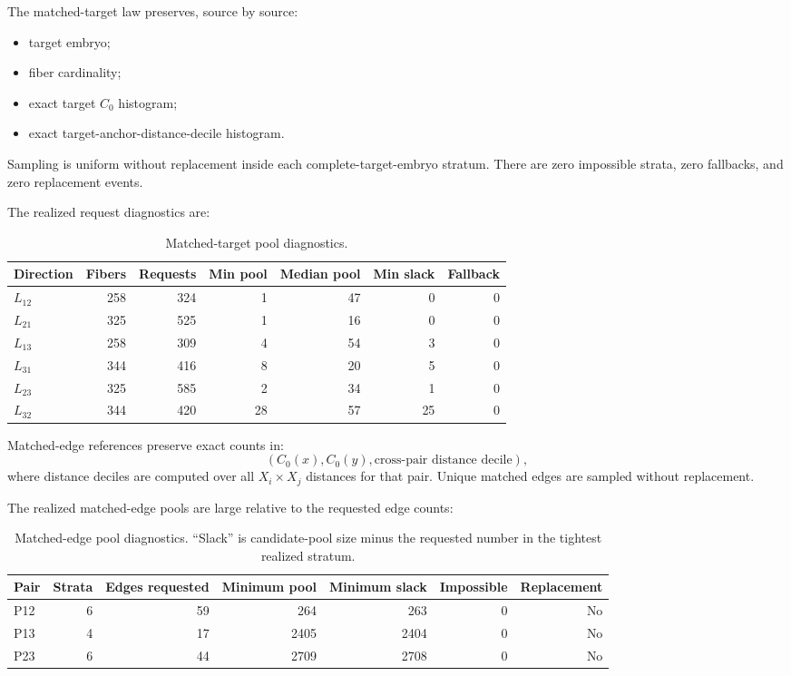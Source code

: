 \documentclass[11pt]{article}
\newcommand{\Czero}{C_0}
\begin{document}
The matched-target law preserves, source by source:
\begin{itemize}[leftmargin=2em]
\item target embryo;
\item fiber cardinality;
\item exact target \(\Czero\) histogram;
\item exact target-anchor-distance-decile histogram.
\end{itemize}
Sampling is uniform without replacement inside each complete-target-embryo stratum. There are zero impossible strata, zero fallbacks, and zero replacement events.

The realized request diagnostics are:

\begin{table}[htbp]
\centering
\small
\caption{Matched-target pool diagnostics.}
\begin{tabular}{@{}lrrrrrr@{}}
\toprule
Direction & Fibers & Requests & Min pool & Median pool & Min slack & Fallback\\
\midrule
\(L_{12}\)&258&324&1&47&0&0\\
\(L_{21}\)&325&525&1&16&0&0\\
\(L_{13}\)&258&309&4&54&3&0\\
\(L_{31}\)&344&416&8&20&5&0\\
\(L_{23}\)&325&585&2&34&1&0\\
\(L_{32}\)&344&420&28&57&25&0\\
\bottomrule
\end{tabular}
\end{table}

Matched-edge references preserve exact counts in:
\[
(\Czero(x),\Czero(y),\text{cross-pair distance decile}),
\]
where distance deciles are computed over all \(X_i\times X_j\) distances for that pair. Unique matched edges are sampled without replacement.

The realized matched-edge pools are large relative to the requested edge counts:

\begin{table}[htbp]
\centering
\small
\caption{Matched-edge pool diagnostics. ``Slack'' is candidate-pool size minus the requested number in the tightest realized stratum.}
\label{tab:edgepools}
\begin{tabular}{@{}lrrrrrr@{}}
\toprule
Pair & Strata & Edges requested & Minimum pool & Minimum slack & Impossible & Replacement\\
\midrule
P12 & 6 & 59 & 264 & 263 & 0 & No\\
P13 & 4 & 17 & 2405 & 2404 & 0 & No\\
P23 & 6 & 44 & 2709 & 2708 & 0 & No\\
\bottomrule
\end{tabular}
\end{table}
\end{document}
